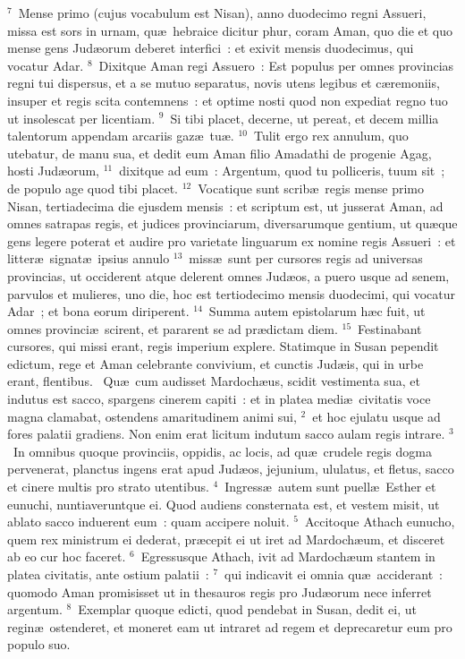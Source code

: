 ${}^{7}$~Mense primo (cujus vocabulum est Nisan), anno duodecimo regni Assueri, missa est sors in urnam, qu\ae\ hebraice dicitur phur, coram Aman, quo die et quo mense gens Jud\ae orum deberet interfici~: et exivit mensis duodecimus, qui vocatur Adar.
${}^{8}$~Dixitque Aman regi Assuero~: Est populus per omnes provincias regni tui dispersus, et a se mutuo separatus, novis utens legibus et c\ae remoniis, insuper et regis scita contemnens~: et optime nosti quod non expediat regno tuo ut insolescat per licentiam.
${}^{9}$~Si tibi placet, decerne, ut pereat, et decem millia talentorum appendam arcariis gaz\ae\ tu\ae .
${}^{10}$~Tulit ergo rex annulum, quo utebatur, de manu sua, et dedit eum Aman filio Amadathi de progenie Agag, hosti Jud\ae orum,
${}^{11}$~dixitque ad eum~: Argentum, quod tu polliceris, tuum sit~; de populo age quod tibi placet.
${}^{12}$~Vocatique sunt scrib\ae\ regis mense primo Nisan, tertiadecima die ejusdem mensis~: et scriptum est, ut jusserat Aman, ad omnes satrapas regis, et judices provinciarum, diversarumque gentium, ut qu\ae que gens legere poterat et audire pro varietate linguarum ex nomine regis Assueri~: et litter\ae\ signat\ae\ ipsius annulo
${}^{13}$~miss\ae\ sunt per cursores regis ad universas provincias, ut occiderent atque delerent omnes Jud\ae os, a puero usque ad senem, parvulos et mulieres, uno die, hoc est tertiodecimo mensis duodecimi, qui vocatur Adar~; et bona eorum diriperent.
${}^{14}$~Summa autem epistolarum h\ae c fuit, ut omnes provinci\ae\ scirent, et pararent se ad pr\ae dictam diem.
${}^{15}$~Festinabant cursores, qui missi erant, regis imperium explere. Statimque in Susan pependit edictum, rege et Aman celebrante convivium, et cunctis Jud\ae is, qui in urbe erant, flentibus.
~\lettrine[lines=10,image=true,loversize=0.05,lraise=-0.03]{Q}{}u\ae\ cum audisset Mardoch\ae us, scidit vestimenta sua, et indutus est sacco, spargens cinerem capiti~: et in platea medi\ae\ civitatis voce magna clamabat, ostendens amaritudinem animi sui,
${}^{2}$~et hoc ejulatu usque ad fores palatii gradiens. Non enim erat licitum indutum sacco aulam regis intrare.
${}^{3}$~In omnibus quoque provinciis, oppidis, ac locis, ad qu\ae\ crudele regis dogma pervenerat, planctus ingens erat apud Jud\ae os, jejunium, ululatus, et fletus, sacco et cinere multis pro strato utentibus.
${}^{4}$~Ingress\ae\ autem sunt puell\ae\ Esther et eunuchi, nuntiaveruntque ei. Quod audiens consternata est, et vestem misit, ut ablato sacco induerent eum~: quam accipere noluit.
${}^{5}$~Accitoque Athach eunucho, quem rex ministrum ei dederat, pr\ae cepit ei ut iret ad Mardoch\ae um, et disceret ab eo cur hoc faceret.
${}^{6}$~Egressusque Athach, ivit ad Mardoch\ae um stantem in platea civitatis, ante ostium palatii~:
${}^{7}$~qui indicavit ei omnia qu\ae\ acciderant~: quomodo Aman promisisset ut in thesauros regis pro Jud\ae orum nece inferret argentum.
${}^{8}$~Exemplar quoque edicti, quod pendebat in Susan, dedit ei, ut regin\ae\ ostenderet, et moneret eam ut intraret ad regem et deprecaretur eum pro populo suo.


